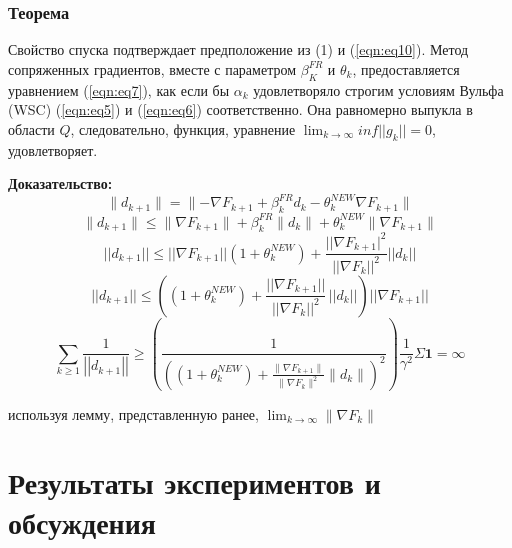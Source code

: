 \subsubsection{Теорема}

Свойство спуска подтверждает предположение из (1) и (\ref{eqn:eq10}). Метод сопряженных
градиентов, вместе с параметром $\beta_{K}^{FR}$ и $\theta_{k}$, предоставляется
уравнением (\ref{eqn:eq7}), как если бы $\alpha_{k}$ удовлетворяло строгим условиям Вульфа
(WSC) (\ref{eqn:eq5}) и (\ref{eqn:eq6}) соответственно. Она равномерно выпукла в области $Q$,
следовательно, функция, уравнение 
$\lim_{k \rightarrow \infty} inf||g_{k}|| = 0$, удовлетворяет.

\noindent \textbf{Доказательство:}
\begin{equation*}
    \lVert d_{k+1} \rVert = \lVert -\nabla F_{k+1}+\beta_{k}^{F R}d_{k}-\theta_{k}^{N E W} \nabla F_{k+1} \rVert
\end{equation*}
\begin{equation*}
    \|d_{k+1}\|\leq\|\nabla F_{k+1}\|+\beta_{k}^{F R}\|d_{k}\|+\theta_{k}^{N E W}\|\nabla F_{k+1}\|
\end{equation*}
\begin{equation*}
    ||d_{k+1}||\leq||\nabla F_{k+1}||(1+\theta_{k}^{N E W})+\frac{||\nabla F_{k+1}|^{2}}{||\nabla F_{k}||^{2}}||d_{k}||
\end{equation*}
\begin{equation*}
    ||d_{k+1}||\leq\left(\left(1+\theta_{k}^{N E W}\right)+\frac{||\nabla F_{k+1}||}{||\nabla F_{k}||^{2}}\,||d_{k}||\right)||\nabla F_{k+1}||
\end{equation*}
\begin{equation*}
    \sum_{k \geq 1}{\frac{1}{\left|\left|d_{k+1}\right|\right|}} \geq \left( 
        \frac{1}{
            \left(
                \left(1 + \theta_{k}^{N E W}\right) + 
                \frac{\lVert \nabla F_{k+1} \rVert}{\lVert \nabla F_{k} \rVert^{2}}\lVert d_{k} \rVert
            \right)^{2}
        }
    \right) \frac{1}{\gamma^{2}}\Sigma\mathbf{1} = \infty
\end{equation*}

\noindent используя лемму, представленную ранее, 
$\lim_{k \rightarrow \infty} \lVert \nabla F_{k} \rVert$

\section{Результаты экспериментов и обсуждения}

